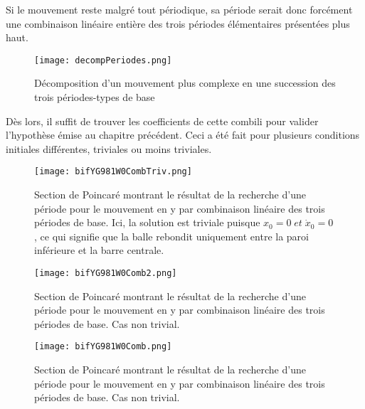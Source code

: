 \documentclass[a4paper]{report}
\begin{document}
Si le mouvement reste malgré tout périodique, sa période serait donc forcément une combinaison linéaire entière des trois périodes élémentaires présentées plus haut.
\begin{figure}[h!]
   \texttt{[image: decompPeriodes.png]}
      \caption[Décomposition d'un mouvement plus complexe en une succession des trois périodes-types de base]{Décomposition d'un mouvement plus complexe en une succession des trois périodes-types de base}
\end{figure}
Dès lors, il suffit de trouver les coefficients de cette combili pour valider l'hypothèse émise au chapitre précédent. Ceci a été fait pour plusieurs conditions initiales différentes, triviales ou moins triviales.
\begin{figure}[H]
   \texttt{[image: bifYG981W0CombTriv.png]}
      \caption[Cas trivial d'une recherche d'une période pour le mouvement en y: g=9.81 ]{Section de Poincaré montrant le résultat de la recherche d'une période pour le mouvement en y par combinaison linéaire des trois périodes de base. Ici, la solution est triviale puisque \(x_0=0 \; et \; \dot{x}_0=0\), ce qui signifie que la balle rebondit uniquement entre la paroi inférieure et la barre centrale.}
\end{figure}
\begin{figure}[h!]
   \texttt{[image: bifYG981W0Comb2.png]}
      \caption[Recherche d'une période pour le mouvement en y: g=9.81 .]{Section de Poincaré montrant le résultat de la recherche d'une période pour le mouvement en y par combinaison linéaire des trois périodes de base. Cas non trivial.}
\end{figure}
\begin{figure}[h!]
   \texttt{[image: bifYG981W0Comb.png]}
      \caption[Recherche d'une période pour le mouvement en y: g=9.81 .]{Section de Poincaré montrant le résultat de la recherche d'une période pour le mouvement en y par combinaison linéaire des trois périodes de base. Cas non trivial. \label{fig:poincNonTrivial}}
\end{figure}
\end{document}
